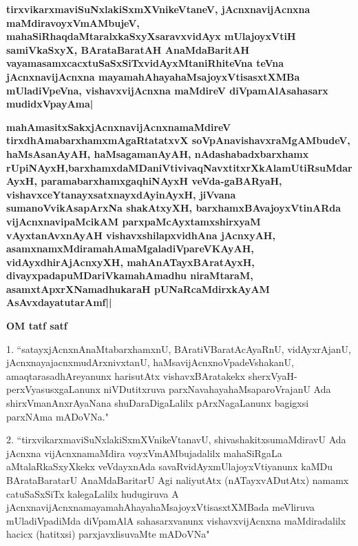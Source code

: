 \medskip
\textbf{tirxvikarxmaviSuNxlakiSxmXVnikeVtaneV, jAcnxnavijAcnxna maMdiravoyxVmAMbujeV, mahaSiR\-haqdaMtaralxkaSxyXsaravxvidAyx\- mUlajoyxVtiH samiVkaSxyX, BArataBaratAH AnaMdaBaritAH vayamasamxcacxtuSaSxSiTxvidAyxMtaniRhiteVna teVna jAcnxna\-vijAcnxna mayamahAhayahaMsajoyxVtisasxtXMBa mUladiVpeVna, vishavxvijAcnxna maMdireV diVpa\-mAlAsahasarx\- mudidxVpayAma|}

\medskip
\textbf{
mahAmasitxSakxjAcnxnavijAcnxnamaMdireV tirxdhAmabarxhamxmAgaRtatatxvX soVpAnavishavx\break\-raMgAMbudeV, haMsAsa\-nAyAH, haMsagamanAyAH, nAdashabadxbarxhamx rUpiNAyxH,\break barxhamxdaMDaniVtivivaqNavxtitxrXkAlamUtiRsuMdarAyxH, paramabarxhamxgaqhiNAyxH veVda-\break gaBARyaH, vishavxceYtanayxsatxnayxdAyinAyxH, jiVvana sumanoVvikAsapArxNa shakAtxyXH, barxhamx\-BAvajoyxVtinARda vijAcnxnavipaMcikAM parxpaMcAyxtamxshirxyaM vAyxtanAvxnAyAH vishavx\break\-shilapxvidhAna jAcnxyAH, asamxnamxMdiramahAmaMgaladiVpareVKAyAH, vidAyxdhirAjAcnxyXH, mahAnATayxBAratAyxH, divayx\-pada\-puMDariVkamahAmadhu niraMtaraM, asamxtApxrXNamadhukaraH pUNaRcaMdirxkAyAM AsAvxdayatutarAmf||}

\begin{center}
{\bfseries{OM tatf satf}}
\end{center}

\newpage

\begin{artha}
1. ``satayxjAcnxnAnaMtabarxhamxnU, BAratiVBaratAcAyaRnU, vidAyxrAjanU, jAcnxna\-yajacnxmudArxnivxtanU, haMsavijAcnxnoVpadeVshakanU, amaqtarasadhAreyanunx harisutAtx vishavxBAratakekx sherxVyaH-perxVyasusxgaLanunx niVDu\-titxruva parxNavahayahaMsaparoVrajanU Ada shirxVmanAnxrAyaNana shuDaraDigaLalilx pArxNagaLanunx bagigxsi parxNAma mADoVNa."
\end{artha}

\begin{artha}
2. ``tirxvikarxmaviSuNxlakiSxmXVnikeVtanavU, shivashakitxsumaMdiravU Ada jAcnxna vijAcnxna\-maMdira voyxVmAMbujadalilx mahaSiRgaLa aMtalaRkaSxyXkekx veVdayxnAda savaRvidAyxmUlajoyxVtiyanunx kaMDu BArataBaratarU AnaMdaBaritarU Agi naliyutAtx (nATayx\-vADutAtx) namamx catuSaSxSiTx kalegaLalilx hudugiruva A jAcnxnavijAcnxna\-mayamahAhaya\-haMsajoyxVtisasxtXMBada meVliruva mUladiVpadiMda diVpamAlA sahasarxvanunx vishavx\-vijAcnxna\- maMdiradalilx hacicx (hatitxsi) parxjavxlisuvaMte mADoVNa"
\end{artha}

